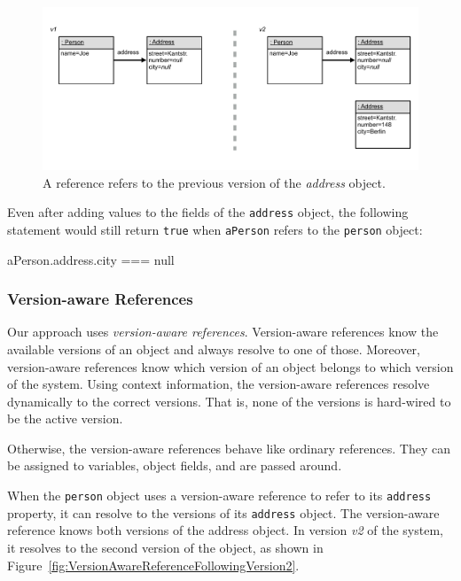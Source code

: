 \begin{figure}[h!]
    \centering
    \includegraphics[width=\textwidth]{figures/4_approach/4_referenceToPreviousVersion.pdf}
    \caption{A reference refers to the previous version of the \emph{address} object.}
    \label{fig:ReferenceFixedToPreviousVersion}
\end{figure}

Even after adding values to the fields of the \lstinline{address} object, the following statement would still return \lstinline{true} when \lstinline{aPerson} refers to the \lstinline{person} object:

\begin{code}{}{}
aPerson.address.city === null
\end{code}
\iffalse
\end{verbatim}\fi


\subsubsection{Version-aware References}

Our approach uses \emph{version-aware references}.
Version-aware references know the available versions of an object and always resolve to one of those.
Moreover, version-aware references know which version of an object belongs to which version of the system.
Using context information, the version-aware references resolve dynamically to the correct versions.
That is, none of the versions is hard-wired to be the active version.

Otherwise, the version-aware references behave like ordinary references.
They can be assigned to variables, object fields, and are passed around.

When the \lstinline{person} object uses a version-aware reference to refer to its \lstinline{address} property, it can resolve to the versions of its \lstinline{address} object.
The version-aware reference knows both versions of the address object.
In version \emph{v2} of the system, it resolves to the second version of the object, as shown in Figure~\ref{fig:VersionAwareReferenceFollowingVersion2}.

